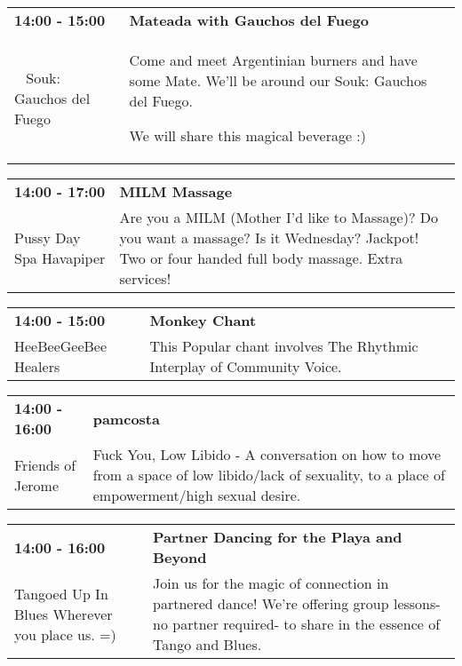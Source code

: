\begin{tabular}{ p{1in} p{2.2in} }
    \textbf{14:00 - 15:00} & \textbf{Mateada with Gauchos del Fuego} \\
    ~ \newline Souk: Gauchos del Fuego & Come and meet Argentinian burners and have some Mate. We'll be around our Souk: Gauchos del Fuego.

We will share this magical beverage :) \\
    \hline 
\end{tabular}
    
\begin{tabular}{ p{1in} p{2.2in} }
    \textbf{14:00 - 17:00} & \textbf{MILM Massage} \\
    Pussy Day Spa \newline Havapiper & Are you a MILM (Mother I'd like to Massage)?  Do you want a massage? Is it Wednesday?  Jackpot! Two or four handed full body massage. Extra services! \\
    \hline 
\end{tabular}
    
\begin{tabular}{ p{1in} p{2.2in} }
    \textbf{14:00 - 15:00} & \textbf{Monkey  Chant} \\
    HeeBeeGeeBee Healers \newline  & This Popular chant involves The Rhythmic Interplay of Community Voice. \\
    \hline 
\end{tabular}
    
\begin{tabular}{ p{1in} p{2.2in} }
    \textbf{14:00 - 16:00} & \textbf{pamcosta} \\
    Friends of Jerome \newline  & Fuck You, Low Libido - A conversation on how to move from a space of low libido/lack of sexuality, to a place of empowerment/high sexual desire. \\
    \hline 
\end{tabular}
    
\begin{tabular}{ p{1in} p{2.2in} }
    \textbf{14:00 - 16:00} & \textbf{Partner Dancing for the Playa and Beyond} \\
    Tangoed Up In Blues \newline Wherever you place us. =) & Join us for the magic of connection in partnered dance! We're offering group lessons-no partner required- to share in the essence of Tango and Blues. \\
    \hline 
\end{tabular}
    

